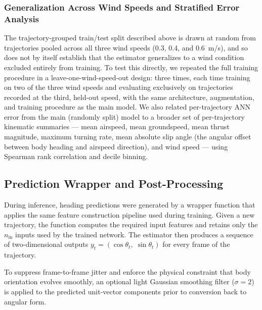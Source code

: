 \documentclass[11pt]{article}
\begin{document}
\subsubsection*{Generalization Across Wind Speeds and Stratified Error Analysis}
The trajectory-grouped train/test split described above is drawn at random from trajectories pooled across all three wind speeds (0.3, 0.4, and 0.6~m/s), and so does not by itself establish that the estimator generalizes to a wind condition excluded entirely from training. To test this directly, we repeated the full training procedure in a leave-one-wind-speed-out design: three times, each time training on two of the three wind speeds and evaluating exclusively on trajectories recorded at the third, held-out speed, with the same architecture, augmentation, and training procedure as the main model. We also related per-trajectory ANN error from the main (randomly split) model to a broader set of per-trajectory kinematic summaries --- mean airspeed, mean groundspeed, mean thrust magnitude, maximum turning rate, mean absolute slip angle (the angular offset between body heading and airspeed direction), and wind speed --- using Spearman rank correlation and decile binning.

\subsection*{Prediction Wrapper and Post-Processing}
During inference, heading predictions were generated by a wrapper function that applies the same feature construction pipeline used during training. Given a new trajectory, the function computes the required input features and retains only the $n_{\text{in}}$ inputs used by the trained network. The estimator then produces a sequence of two-dimensional outputs $y_t = (\cos\theta_t,\; \sin\theta_t)$ for every frame of the trajectory.

To suppress frame-to-frame jitter and enforce the physical constraint that body orientation evolves smoothly, an optional light Gaussian smoothing filter ($\sigma = 2$) is applied to the predicted unit-vector components prior to conversion back to angular form.
\end{document}
